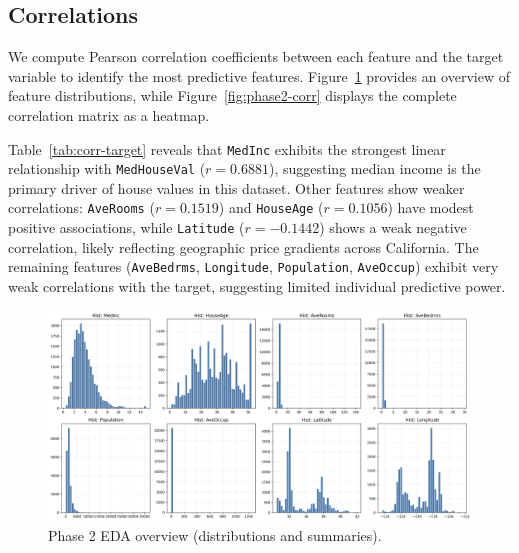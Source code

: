\documentclass[runningheads]{llncs}
\begin{document}
\subsection{Correlations}
We compute Pearson correlation coefficients between each feature and the target variable to identify the most predictive features. Figure~\ref{fig:phase2-eda} provides an overview of feature distributions, while Figure~\ref{fig:phase2-corr} displays the complete correlation matrix as a heatmap.

Table~\ref{tab:corr-target} reveals that \texttt{MedInc} exhibits the strongest linear relationship with \texttt{MedHouseVal} ($r = 0.6881$), suggesting median income is the primary driver of house values in this dataset. Other features show weaker correlations: \texttt{AveRooms} ($r = 0.1519$) and \texttt{HouseAge} ($r = 0.1056$) have modest positive associations, while \texttt{Latitude} ($r = -0.1442$) shows a weak negative correlation, likely reflecting geographic price gradients across California. The remaining features (\texttt{AveBedrms}, \texttt{Longitude}, \texttt{Population}, \texttt{AveOccup}) exhibit very weak correlations with the target, suggesting limited individual predictive power.

\begin{figure}[H]
  \centering
  \includegraphics[width=\linewidth]{data/Phase 2 EDA.png}
  \caption{Phase 2 EDA overview (distributions and summaries).}
  \label{fig:phase2-eda}
\end{figure}
\end{document}
